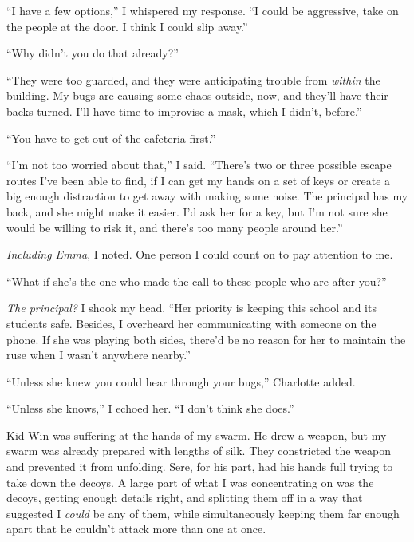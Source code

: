 ``I have a few options,'' I whispered my response.  ``I could be aggressive, take on the people at the door.  I think I could slip away.''



``Why didn't you do that already?''



``They were too guarded, and they were anticipating trouble from \emph{within} the building.  My bugs are causing some chaos outside, now, and they'll have their backs turned.  I'll have time to improvise a mask, which I didn't, before.''



``You have to get out of the cafeteria first.''



``I'm not too worried about that,'' I said.  ``There's two or three possible escape routes I've been able to find, if I can get my hands on a set of keys or create a big enough distraction to get away with making some noise.  The principal has my back, and she might make it easier.  I'd ask her for a key, but I'm not sure she would be willing to risk it, and there's too many people around her.''



\emph{Including Emma}, I noted.  One person I could count on to pay attention to me.



``What if she's the one who made the call to these people who are after you?''



\emph{The principal?}  I shook my head.  ``Her priority is keeping this school and its students safe.  Besides, I overheard her communicating with someone on the phone.  If she was playing both sides, there'd be no reason for her to maintain the ruse when I wasn't anywhere nearby.''



``Unless she knew you could hear through your bugs,'' Charlotte added.



``Unless she knows,'' I echoed her.  ``I don't think she does.''



Kid Win was suffering at the hands of my swarm.  He drew a weapon, but my swarm was already prepared with lengths of silk.  They constricted the weapon and prevented it from unfolding.  Sere, for his part, had his hands full trying to take down the decoys.  A large part of what I was concentrating on was the decoys, getting enough details right, and splitting them off in a way that suggested I \emph{could} be any of them, while simultaneously keeping them far enough apart that he couldn't attack more than one at once.



